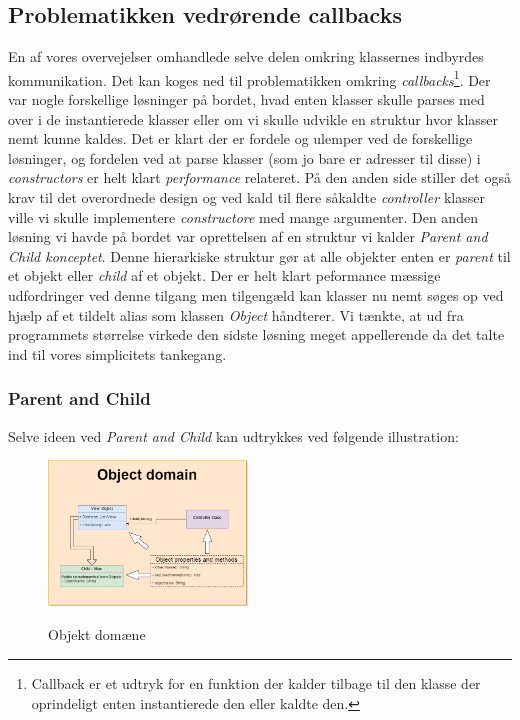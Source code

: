 \documentclass[]{article}
\begin{document}
\subsection{Problematikken vedrørende callbacks}
En af vores overvejelser omhandlede selve delen omkring klassernes indbyrdes kommunikation. Det kan koges ned til problematikken omkring \textit{callbacks}\footnote{Callback er et udtryk for en funktion der kalder tilbage til den klasse der oprindeligt enten instantierede den eller kaldte den.}. Der var nogle forskellige løsninger på bordet, hvad enten klasser skulle parses med over i de instantierede klasser eller om vi skulle udvikle en struktur hvor klasser nemt kunne kaldes. Det er klart der er fordele og ulemper ved de forskellige løsninger, og fordelen ved at parse klasser (som jo bare er adresser til disse) i \textit{constructors} er helt klart \textit{performance} relateret. På den anden side stiller det også krav til det overordnede design og ved kald til flere såkaldte \textit{controller} klasser ville vi skulle implementere \textit{constructore} med mange argumenter. Den anden løsning vi havde på bordet var oprettelsen af en struktur vi kalder \textit{Parent and Child konceptet}. Denne hierarkiske struktur gør at alle objekter enten er \textit{parent} til et objekt eller \textit{child} af et objekt. Der er helt klart peformance mæssige udfordringer ved denne tilgang men tilgengæld kan klasser nu nemt søges op ved hjælp af et tildelt alias som klassen \textit{Object} håndterer. Vi tænkte, at ud fra programmets størrelse virkede den sidste løsning meget appellerende da det talte ind til vores simplicitets tankegang. 
\subsubsection{Parent and Child}
\pagebreak
Selve ideen ved \textit{Parent and Child} kan udtrykkes ved følgende illustration:

\begin{figure}[h!]
	
	\centering
	\includegraphics[width=200px]{Object_hierarchy.jpg}
	\label{fig:hierarchy}
	\caption{Objekt domæne}
\end{figure}
\end{document}
